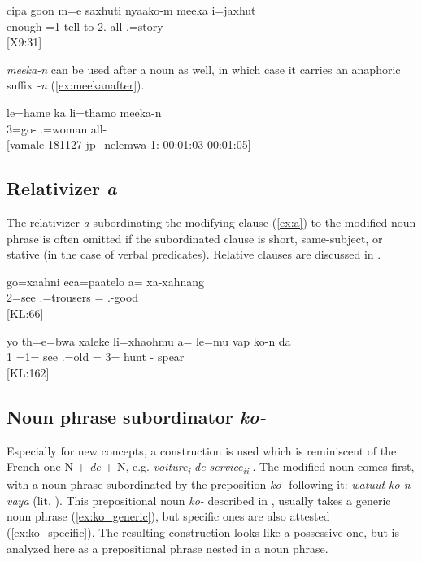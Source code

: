\ea\label{ex:meekan2}
\gll cipa goon m=e saxhuti nyaako-m meeka i=jaxhut \\
  enough =1 tell to-2. all .=story  \\
\glt {} {[X9:31]}
\z

\textit{meeka-n}  can be used after a noun as well, in which case it carries an anaphoric suffix \textit{-n} (\ref{ex:meekanafter}). 

\ea \label{ex:meekanafter}
\gll le=hame ka li=thamo meeka-n\\
 3=go-  .=woman all-\\
\glt {}  {[vamale-181127-jp\_nelemwa-1: 00:01:03-00:01:05]}
\z

\subsection{Relativizer \textit{a}}
\label{sec:a}
The relativizer \textit{a} subordinating the modifying clause (\ref{ex:a}) to the modified noun phrase is often omitted if the subordinated clause is short, same-subject, or stative (in the case of verbal predicates). Relative clauses are discussed in .

\ea \label{ex:a}
\gll go=xaahni eca=paatelo a= xa-xahnang\\
 2=see .=trousers = .-good\\
\glt {} {[KL:66]}
\z

\ea
\gll yo th=e=bwa xaleke li=xhaohmu a= le=mu vap ko-n da \\
 1 =1= see .=old = 3= hunt - spear \\
\glt {} {[KL:162]}
\z

\subsection{Noun phrase subordinator \textit{ko-}}
\label{ssec:ko_N}

Especially for new concepts, a construction is used which is reminiscent of the French one N + \textit{de} + N, e.g. \textit{voiture\textsubscript{i} de service\textsubscript{ii}} . The modified noun comes first, with a noun phrase subordinated by the preposition \textit{ko-} following it: \textit{watuut ko-n vaya}  (lit. ). This prepositional noun \textit{ko-}  described in , usually takes a generic noun phrase (\ref{ex:ko_generic}), but specific ones are also attested (\ref{ex:ko_specific}). The resulting construction looks like a possessive one, but is analyzed here as a prepositional phrase nested in a noun phrase.


